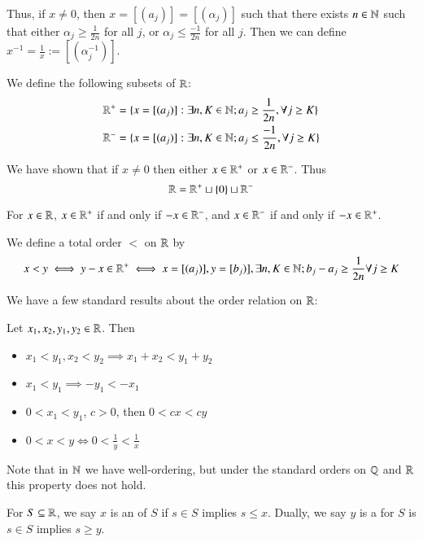 Thus, if $x \neq 0$, then $x = [(a_j)] = [(\alpha_j)]$ such that there exists $n \in \mathbb N$ such that either $\alpha_j \geq \frac{1}{2n}$ for all $j$, or $\alpha_j \leq \frac{-1}{2n}$ for all $j$. Then we can define $x^{-1} = \frac{1}{x} := [(\alpha_j^{-1})]$.

\begin{defn}
    We define the following subsets of $\mathbb R$: \begin{align*}
        \mathbb R^+ &= \{x = [(a_j)]: \exists n,K \in \mathbb N;a_j\geq \frac{1}{2n},\forall j \geq K\} \\
        \mathbb R^- &= \{x = [(a_j)]: \exists n,K \in \mathbb N; a_j \leq \frac{-1}{2n},\forall j\geq K\}
    \end{align*}
\end{defn}
We have shown that if $x \neq 0$ then either $x \in \mathbb R^+$ or $x \in \mathbb R^-$. Thus $$\mathbb R = \mathbb R^+ \sqcup \{0\}\sqcup \mathbb R^-$$

\begin{prop}
    For $x \in \mathbb R$, $x \in \mathbb R^+$ if and only if $-x \in \mathbb R^-$, and $x \in \mathbb R^-$ if and only if $-x \in \mathbb R^+$.
\end{prop}

\begin{defn}
    We define a total order $<$ on $\mathbb R$ by $$x < y \iff y-x \in \mathbb R^+ \iff x = [(a_j)],y=[b_j)],\exists n,K \in \mathbb N;b_j-a_j \geq \frac{1}{2n}\forall j \geq K$$
\end{defn}

We have a few standard results about the order relation on $\mathbb R$: 

\begin{prop}\label{prop:1.6.4}
    Let $x_1,x_2,y_1,y_2 \in \mathbb R$. Then \begin{itemize}
        \item $x_1 < y_1, x_2 < y_2 \implies x_1+x_2 < y_1 + y_2$
        \item $x_1 < y_1 \implies -y_1 < -x_1$
        \item $0 < x_1 < y_1$, $c > 0$, then $0 < cx < cy$
        \item $0 < x < y \iff 0 < \frac{1}{y} < \frac{1}{x}$
    \end{itemize}
\end{prop}

Note that in $\mathbb N$ we have well-ordering, but under the standard orders on $\mathbb Q$ and $\mathbb R$ this property does not hold.

\begin{defn}
    For $S \subseteq \mathbb R$, we say $x$ is an  of $S$ if $s \in S$ implies $s \leq x$. Dually, we say $y$ is a  for $S$ is $s \in S$ implies $s \geq y$.
\end{defn}

